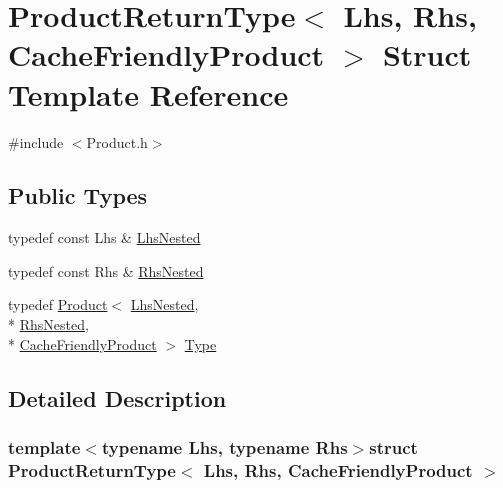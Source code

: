 \hypertarget{struct_product_return_type_3_01_lhs_00_01_rhs_00_01_cache_friendly_product_01_4}{\section{Product\-Return\-Type$<$ Lhs, Rhs, Cache\-Friendly\-Product $>$ Struct Template Reference}
\label{struct_product_return_type_3_01_lhs_00_01_rhs_00_01_cache_friendly_product_01_4}
}


{\ttfamily \#include $<$Product.\-h$>$}

\subsection*{Public Types}
\begin{DoxyCompactItemize}
\item 
typedef const Lhs \& \hyperlink{struct_product_return_type_3_01_lhs_00_01_rhs_00_01_cache_friendly_product_01_4_a6b52852c9c4b8b71201934ae33a8e6b3}{Lhs\-Nested}
\item 
typedef const Rhs \& \hyperlink{struct_product_return_type_3_01_lhs_00_01_rhs_00_01_cache_friendly_product_01_4_a8fa0613d70d5dfc2abc4ef33c3c36d1c}{Rhs\-Nested}
\item 
typedef \hyperlink{class_product}{Product}$<$ \hyperlink{struct_product_return_type_3_01_lhs_00_01_rhs_00_01_cache_friendly_product_01_4_a6b52852c9c4b8b71201934ae33a8e6b3}{Lhs\-Nested}, \\*
\hyperlink{struct_product_return_type_3_01_lhs_00_01_rhs_00_01_cache_friendly_product_01_4_a8fa0613d70d5dfc2abc4ef33c3c36d1c}{Rhs\-Nested}, \\*
\hyperlink{_constants_8h_a19539c4a85742928cd91d83569d63c06a3adaf09db92895066d5e22f9eed4e68e}{Cache\-Friendly\-Product} $>$ \hyperlink{struct_product_return_type_3_01_lhs_00_01_rhs_00_01_cache_friendly_product_01_4_a87d5a238bf1b48cd90967a036b0bf61d}{Type}
\end{DoxyCompactItemize}


\subsection{Detailed Description}
\subsubsection*{template$<$typename Lhs, typename Rhs$>$struct Product\-Return\-Type$<$ Lhs, Rhs, Cache\-Friendly\-Product $>$}



